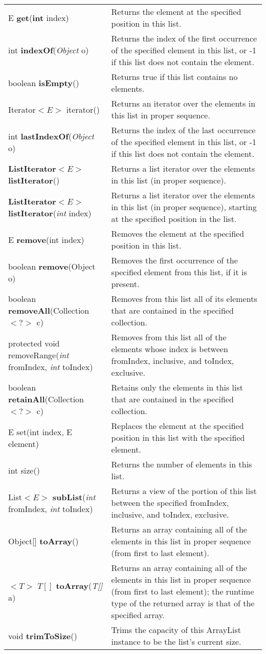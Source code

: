 \documentclass[main]{subfiles}
\begin{document}
\begin{longtable}{p{0.4\linewidth} p{0.6\linewidth}}
E \textbf{get}(\textbf{int} index) &
Returns the element at the specified position in this list.\\

int \textbf{indexOf}(\textit{Object} o) &
Returns the index of the first occurrence of the specified element in this list, or -1 if this list does not contain the element.\\
boolean \textbf{isEmpty}() &
Returns true if this list contains no elements.\\
Iterator$<E>$ iterator() &
Returns an iterator over the elements in this list in proper sequence.\\
int \textbf{lastIndexOf}(\textit{Object} o) &
Returns the index of the last occurrence of the specified element in this list, or -1 if this list does not contain the element.\\
\textbf{ListIterator}$<E>$ \textbf{listIterator}() &
Returns a list iterator over the elements in this list (in proper sequence).\\
\textbf{ListIterator}$<E>$ \textbf{listIterator}(\textit{int} index) &
Returns a list iterator over the elements in this list (in proper sequence), starting at the specified position in the list.\\
E \textbf{remove}(int index) &
Removes the element at the specified position in this list.\\
boolean \textbf{remove}(Object o) &
Removes the first occurrence of the specified element from this list, if it is present.\\
boolean \textbf{removeAll}(Collection$<?>$ c) &
Removes from this list all of its elements that are contained in the specified collection.\\
protected void removeRange(\textit{int} fromIndex, \textit{int} toIndex) &
Removes from this list all of the elements whose index is between fromIndex, inclusive, and toIndex, exclusive.\\
boolean \textbf{retainAll}(Collection$<?>$ c) &
Retains only the elements in this list that are contained in the specified collection.\\
E set(int index, E element) &
Replaces the element at the specified position in this list with the specified element.\\
int size() &
Returns the number of elements in this list.\\
List$<E>$ \textbf{subList}(\textit{int} fromIndex, \textit{int} toIndex) &
Returns a view of the portion of this list between the specified fromIndex, inclusive, and toIndex, exclusive.\\
Object[] \textbf{toArray}() &
Returns an array containing all of the elements in this list in proper sequence (from first to last element).\\
$<T>$ $T[]$ \textbf{toArray}(\textit{T[]} a) &
Returns an array containing all of the elements in this list in proper sequence (from first to last element); the runtime type of the returned array is that of the specified array.\\
void \textbf{trimToSize}() &
Trims the capacity of this ArrayList instance to be the list's current size.\\
\end{longtable}
\todo[inline]{}
\end{document}
